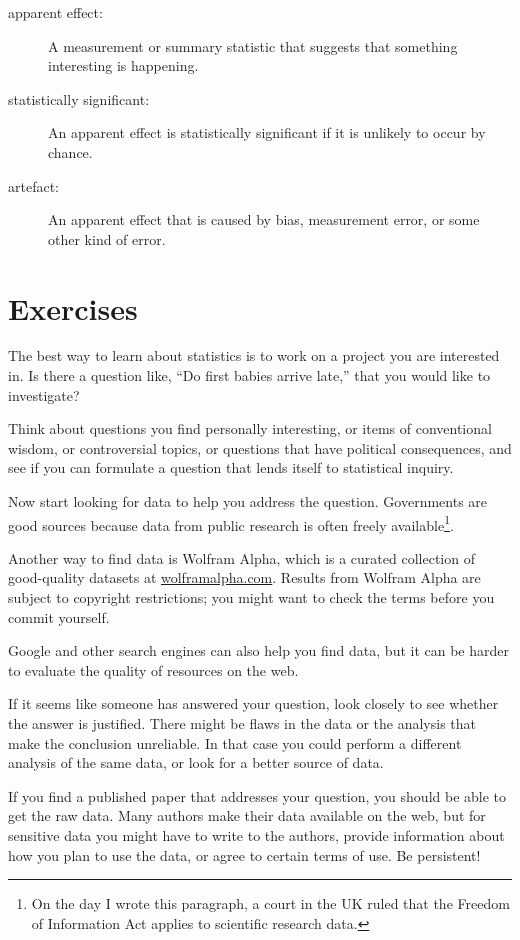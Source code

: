 \documentclass[10pt]{book}
\begin{document}
\begin{description}
\item[apparent effect:] A measurement or summary statistic that
suggests that something interesting is happening.

\item[statistically significant:] An apparent effect is statistically
  significant if it is unlikely to occur by chance.

\item[artefact:] An apparent effect that is caused by bias,
  measurement error, or some other kind of error.

\end{description}

\section{Exercises}

\begin{ex}

The best way to learn about statistics is to work on a project you are
interested in.  Is there a question like, ``Do first babies arrive
late,'' that you would like to investigate?

Think about questions you find personally interesting, or items of
conventional wisdom, or controversial topics, or questions that have
political consequences, and see if you can formulate a question that
lends itself to statistical inquiry.

Now start looking for data to help you address the
question.  Governments are good sources because data from
public research is often freely available\footnote{On the day
I wrote this paragraph, a court in the UK ruled that the
Freedom of Information Act applies to scientific research data.}.

Another way to find data is Wolfram Alpha, which is a curated
collection of good-quality datasets at \url{wolframalpha.com}.
Results from Wolfram Alpha are subject to copyright
restrictions; you might want to check the terms before you commit
yourself.

Google and other search engines can also help you find data, but it
can be harder to evaluate the quality of resources on the web.

If it seems like someone has answered your question, look closely to
see whether the answer is justified.  There might be flaws in the data
or the analysis that make the conclusion unreliable.  In that case you
could perform a different analysis of the same data, or look for a
better source of data.

If you find a published paper that addresses your question, you
should be able to get the raw data.  Many authors make their data
available on the web, but for sensitive data you might have to
write to the authors, provide information about how you plan to use
the data, or agree to certain terms of use.  Be persistent!

\end{ex}
\end{document}
